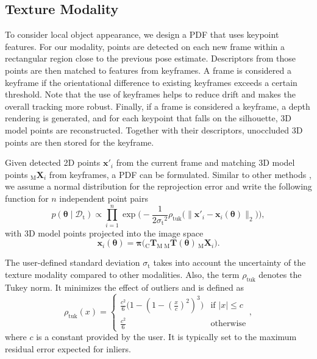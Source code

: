 \documentclass[letterpaper, 10 pt, conference]{ieeeconf}
\begin{document}
\subsection{Texture Modality}\label{sec:c2}
To consider local object appearance, we design a \ac{PDF} that uses keypoint features.
For our modality, points are detected on each new frame within a rectangular region close to the previous pose estimate.
Descriptors from those points are then matched to features from keyframes.
A frame is considered a keyframe if the orientational difference to existing keyframes exceeds a certain threshold.
Note that the use of keyframes helps to reduce drift and makes the overall tracking more robust.
Finally, if a frame is considered a keyframe, a depth rendering is generated, and for each keypoint that falls on the silhouette, 3D model points are reconstructed.
Together with their descriptors, unoccluded 3D points are then stored for the keyframe.

Given detected 2D points $\pmb{x}'_i$ from the current frame and matching 3D model points ${}_\textrm{M}\pmb{X}_i$ from keyframes, a \ac{PDF} can be formulated.
Similar to other methods \cite{Vacchetti2004}, we assume a normal distribution for the reprojection error and write the following function for $n$ independent point pairs
\begin{equation}\label{eq:c22}
	p(\pmb{\theta} \mid \pmb{\mathcal{D}}_\textrm{t}) \propto \prod_{i=1}^{n} \exp\bigg(-\frac{1}{2{\sigma_\textrm{t}}^2}\rho_\textrm{tuk}\Big(\big\lVert\pmb{x}'_i - \pmb{x}_i(\pmb{\theta})\big\rVert_2\Big)\bigg),
\end{equation}
with 3D model points projected into the image space
\begin{equation}\label{eq:c23}
\pmb{x}_i(\pmb{\theta}) = \pmb{\pi}\big({}_\textrm{C}\pmb{T}_\textrm{M}\, {}_\textrm{M}\pmb{T}(\pmb{\theta})\,{}_\textrm{M}\pmb{X}_i\big).
\end{equation}

The user-defined standard deviation $\sigma_\textrm{t}$ takes into account the uncertainty of the texture modality compared to other modalities.
Also, the term $\rho_\textrm{tuk}$ denotes the Tukey norm.
It minimizes the effect of outliers and is defined as
\begin{equation}\label{eq:c24}
	\rho_\textrm{tuk}(x) =
	\begin{cases}
		\frac{c^2}{6}\big(1 - (1 - (\frac{x}{c})^2)^3\big)  & \text{if $|x|\leq c$} \\[2pt]
		\frac{c^2}{6} &\text{otherwise} 
	\end{cases},
\end{equation}
where $c$ is a constant provided by the user.
It is typically set to the maximum residual error expected for inliers.
\end{document}
